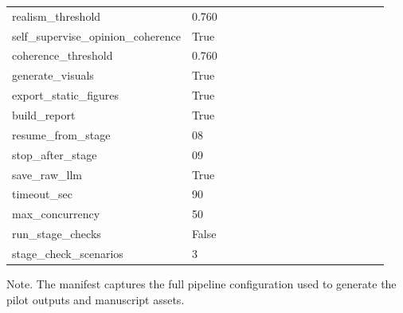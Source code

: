 \begin{table}[htbp]
{\begin{tabular}{p{0.24\linewidth}p{0.70\linewidth}}
realism\_threshold & 0.760 \\
self\_supervise\_opinion\_coherence & True \\
coherence\_threshold & 0.760 \\
generate\_visuals & True \\
export\_static\_figures & True \\
build\_report & True \\
resume\_from\_stage & 08 \\
stop\_after\_stage & 09 \\
save\_raw\_llm & True \\
timeout\_sec & 90 \\
max\_concurrency & 50 \\
run\_stage\_checks & False \\
stage\_check\_scenarios & 3 \\
\bottomrule
\end{tabular}
}
\par\smallskip
{\normalsize Note. The manifest captures the full pipeline configuration used to generate the pilot outputs and manuscript assets.}
\end{table}